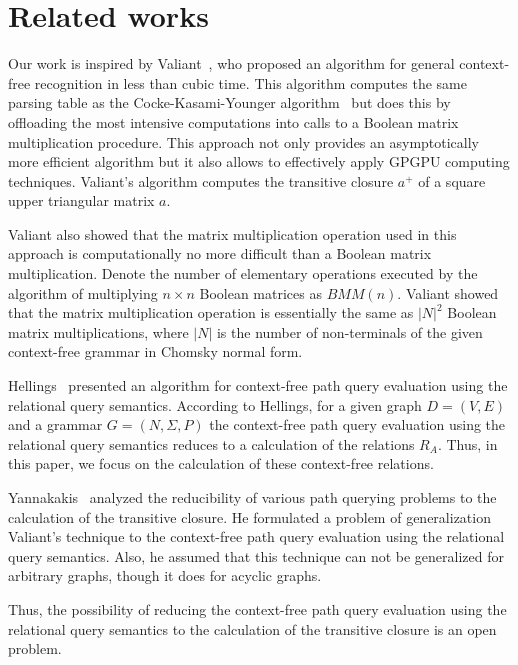 \section{Related works} \label{section_related}
Our work is inspired by Valiant~\cite{valiant}, who proposed an algorithm for general context-free recognition in less than cubic time. This algorithm computes the same parsing table as the Cocke-Kasami-Younger algorithm~\cite{kasami, younger} but does this by offloading the most intensive computations into calls to a Boolean matrix multiplication procedure. This approach not only provides an asymptotically more efficient algorithm but it also allows to effectively apply GPGPU computing techniques. Valiant's algorithm computes the transitive closure $a^+$ of a square upper triangular matrix $a$.

Valiant also showed that the matrix multiplication operation used in this approach is computationally no more difficult than a Boolean matrix multiplication. Denote the number of elementary operations executed by the algorithm of multiplying $n \times n$ Boolean matrices as $BMM(n)$. Valiant showed that the matrix multiplication operation is essentially the same as $|N|^2$ Boolean matrix multiplications, where $|N|$ is the number of non-terminals of the given context-free grammar in Chomsky normal form.

Hellings~\cite{hellingsRelational} presented an algorithm for context-free path query evaluation using the relational query semantics. According to Hellings, for a given graph $D = (V, E)$ and a grammar $G = (N, \Sigma, P)$ the context-free path query evaluation using the relational query semantics reduces to a calculation of the relations $R_A$. Thus, in this paper, we focus on the calculation of these context-free relations.

Yannakakis~\cite{transitive-closure} analyzed the reducibility of various path querying problems to the calculation of the transitive closure. He formulated a problem of generalization Valiant's technique to the context-free path query evaluation using the relational query semantics. Also, he assumed that this technique can not be generalized for arbitrary graphs, though it does for acyclic graphs.

Thus, the possibility of reducing the context-free path query evaluation using the relational query semantics to the calculation of the transitive closure is an open problem.
